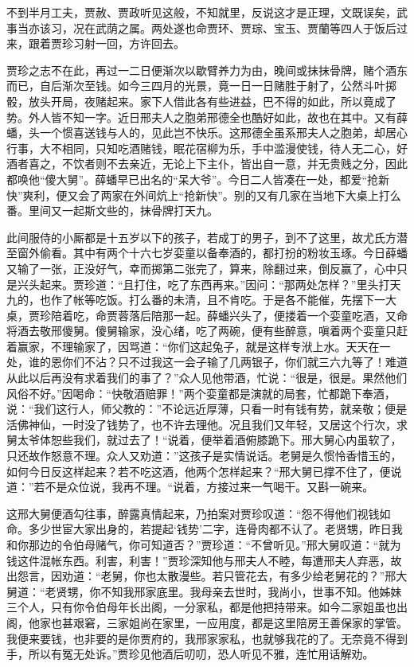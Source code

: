 \documentclass[12pt,oneside]{book}
\begin{document}
不到半月工夫，贾赦、贾政听见这般，不知就里，反说这才是正理，文既误矣，武事当亦该习，况在武荫之属。两处遂也命贾环、贾琮、宝玉、贾蘭等四人于饭后过来，跟着贾珍习射一回，方许回去。

贾珍之志不在此，再过一二日便渐次以歇臂养力为由，晚间或抹抹骨牌，赌个酒东而已，自后渐次至钱。如今三四月的光景，竟一日一日赌胜于射了，公然斗叶掷骰，放头开局，夜赌起来。家下人借此各有些进益，巴不得的如此，所以竟成了势。外人皆不知一字。近日邢夫人之胞弟邢德全也酷好如此，故也在其中。又有薛蟠，头一个惯喜送钱与人的，见此岂不快乐。这邢德全虽系邢夫人之胞弟，却居心行事，大不相同，只知吃酒赌钱，眠花宿柳为乐，手中滥漫使钱，待人无二心，好酒者喜之，不饮者则不去亲近，无论上下主仆，皆出自一意，并无贵贱之分，因此都唤他“傻大舅”。薛蟠早已出名的“呆大爷”。今日二人皆凑在一处，都爱“抢新快”爽利，便又会了两家在外间炕上“抢新快”。别的又有几家在当地下大桌上打么番。里间又一起斯文些的，抹骨牌打天九。

此间服侍的小厮都是十五岁以下的孩子，若成丁的男子，到不了这里，故尤氏方潜至窗外偷看。其中有两个十六七岁娈童以备奉酒的，都打扮的粉妆玉琢。今日薛蟠又输了一张，正没好气，幸而掷第二张完了，算来，除翻过来，倒反赢了，心中只是兴头起来。贾珍道：“且打住，吃了东西再来。”因问：“那两处怎样？”里头打天九的，也作了帐等吃饭。打么番的未清，且不肯吃。于是各不能催，先摆下一大桌，贾珍陪着吃，命贾蓉落后陪那一起。薛蟠兴头了，便搂着一个娈童吃酒，又命将酒去敬邢傻舅。傻舅输家，没心绪，吃了两碗，便有些醉意，嗔着两个娈童只赶着赢家，不理输家了，因骂道：“你们这起兔子，就是这样专洑上水。天天在一处，谁的恩你们不沾？只不过我这一会子输了几两银子，你们就三六九等了！难道从此以后再没有求着我们的事了？”众人见他带酒，忙说：“很是，很是。果然他们风俗不好。”因喝命：“快敬酒赔罪！”两个娈童都是演就的局套，忙都跪下奉酒，说：“我们这行人，师父教的：”不论远近厚薄，只看一时有钱有势，就亲敬；便是活佛神仙，一时没了钱势了，也不许去理他。况且我们又年轻，又居这个行次，求舅太爷体恕些我们，就过去了！“说着，便举着酒俯膝跪下。邢大舅心内虽软了，只还故作怒意不理。众人又劝道：”这孩子是实情说话。老舅是久惯怜香惜玉的，如何今日反这样起来？若不吃这酒，他两个怎样起来？“邢大舅已撑不住了，便说道：”若不是众位说，我再不理。“说着，方接过来一气喝干。又斟一碗来。

这邢大舅便酒勾往事，醉露真情起来，乃拍案对贾珍叹道：“怨不得他们视钱如命。多少世宦大家出身的，若提起‘钱势’二字，连骨肉都不认了。老贤甥，昨日我和你那边的令伯母赌气，你可知道否？”贾珍道：“不曾听见。”邢大舅叹道：“就为钱这件混帐东西。利害，利害！”贾珍深知他与邢夫人不睦，每遭邢夫人弃恶，故出怨言，因劝道：“老舅，你也太散漫些。若只管花去，有多少给老舅花的？”邢大舅道：“老贤甥，你不知我邢家底里。我母亲去世时，我尚小，世事不知。他姊妹三个人，只有你令伯母年长出阁，一分家私，都是他把持带来。如今二家姐虽也出阁，他家也甚艰窘，三家姐尚在家里，一应用度，都是这里陪房王善保家的掌管。我便来要钱，也非要的是你贾府的，我邢家家私，也就够我花的了。无奈竟不得到手，所以有冤无处诉。”贾珍见他酒后叨叨，恐人听见不雅，连忙用话解劝。
\end{document}
